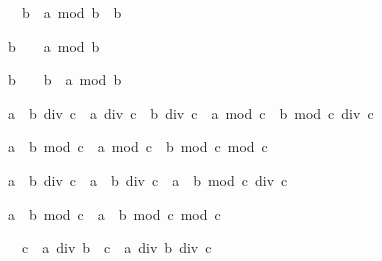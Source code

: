 \begin{isabellebody}
\begin{isamarkuptext}
\begin{isabelle}%
{}\ {\isacharless}\ b\ {\isasymLongrightarrow}\ a\ mod\ b\ {\isacharless}\ b%
\end{isabelle}

\begin{isabelle}%
b\ {\isacharless}\ {}\ {\isasymLongrightarrow}\ a\ mod\ b\ {\isasymle}\ {}%
\end{isabelle}

\begin{isabelle}%
b\ {\isacharless}\ {}\ {\isasymLongrightarrow}\ b\ {\isacharless}\ a\ mod\ b%
\end{isabelle}

\begin{isabelle}%
{\isacharparenleft}a\ {\isacharplus}\ b{\isacharparenright}\ div\ c\ {\isacharequal}\ a\ div\ c\ {\isacharplus}\ b\ div\ c\ {\isacharplus}\ {\isacharparenleft}a\ mod\ c\ {\isacharplus}\ b\ mod\ c{\isacharparenright}\ div\ c%
\end{isabelle}

\begin{isabelle}%
{\isacharparenleft}a\ {\isacharplus}\ b{\isacharparenright}\ mod\ c\ {\isacharequal}\ {\isacharparenleft}a\ mod\ c\ {\isacharplus}\ b\ mod\ c{\isacharparenright}\ mod\ c%
\end{isabelle}

\begin{isabelle}%
a\ {\isacharasterisk}\ b\ div\ c\ {\isacharequal}\ a\ {\isacharasterisk}\ {\isacharparenleft}b\ div\ c{\isacharparenright}\ {\isacharplus}\ a\ {\isacharasterisk}\ {\isacharparenleft}b\ mod\ c{\isacharparenright}\ div\ c%
\end{isabelle}

\begin{isabelle}%
a\ {\isacharasterisk}\ b\ mod\ c\ {\isacharequal}\ a\ {\isacharasterisk}\ {\isacharparenleft}b\ mod\ c{\isacharparenright}\ mod\ c%
\end{isabelle}

\begin{isabelle}%
{}\ {\isacharless}\ c\ {\isasymLongrightarrow}\ a\ div\ {\isacharparenleft}b\ {\isacharasterisk}\ c{\isacharparenright}\ {\isacharequal}\ a\ div\ b\ div\ c%
\end{isabelle}


\end{isamarkuptext}
\end{isabellebody}
